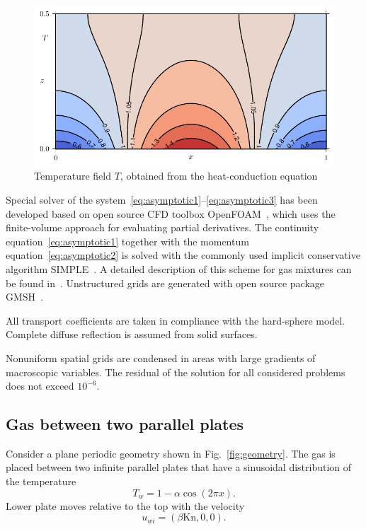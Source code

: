 \documentclass[smallextended, referee]{svjour3} %
\newcommand{\Kn}{\mathrm{Kn}}
\begin{document}
\begin{figure}[ht]
	\centering
	\includegraphics{Fig4}
	\caption{Temperature field \(T\), obtained from the heat-conduction equation}
	\label{fig:moving:T_heat}
\end{figure}

Special solver of the system~\eqref{eq:asymptotic1}--\eqref{eq:asymptotic3}
has been developed based on open source CFD toolbox OpenFOAM\textregistered{}~\cite{OpenFOAM1998},
which uses the finite-volume approach for evaluating partial derivatives.
The continuity equation~\eqref{eq:asymptotic1} together with the momentum equation~\eqref{eq:asymptotic2}
is solved with the commonly used implicit conservative algorithm SIMPLE~\cite{SIMPLE}.
A detailed description of this scheme for gas mixtures can be found in~\cite{Laneryd2007}.
Unstructured grids are generated with open source package GMSH~\cite{GMSH}.

All transport coefficients are taken in compliance with the hard-sphere model.
Complete diffuse reflection is assumed from solid surfaces.

Nonuniform spatial grids are condensed in areas with large gradients of macroscopic variables.
The residual of the solution for all considered problems does not exceed \(10^{-6}\).

\subsection{Gas between two parallel plates}

Consider a plane periodic geometry shown in Fig.~\ref{fig:geometry}.
The gas is placed between two infinite parallel plates
that have a sinusoidal distribution of the temperature
\begin{equation}
	T_w = 1-\alpha\cos(2\pi x).
\end{equation}
Lower plate moves relative to the top with the velocity
\begin{equation}
	u_{wi} = (\beta\Kn,0,0).
\end{equation}
\end{document}
